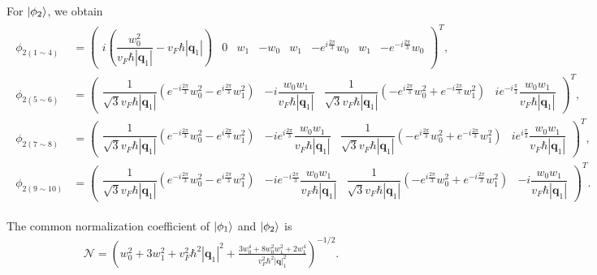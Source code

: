 \documentclass[10pt, oneside]{article}
\newcommand{\p}[1]{\left(#1\right)}
\newcommand{\bv}[1]{\left|#1\right|}
\begin{document}
For \(\ket{\phi_2}\), we obtain
\begin{align}
	\begin{split}
		\phi_{2(1 \sim 4)}
	&=
	\begin{pmatrix}
		i \p{\dfrac{w_{0}^{2}}{v_F \hbar \bv{\bm{q}_1}} - v_F \hbar \bv{\bm{q}_1}} &
		0 &
		w_1 &
		- w_0 &
		w_1 &
		- e^{i \frac{2\pi}{3}} w_0 &
		w_1 &
		- e^{- i \frac{2\pi}{3}} w_0
	\end{pmatrix}^{T},
	\\[0.5em]
	\phi_{2(5 \sim 6)}
	&=
	\begin{pmatrix}
		\dfrac{1}{\sqrt{3} v_F \hbar \bv{\bm{q}_1}}
		\p{e^{-i \frac{2\pi}{3}} w_{0}^{2} - e^{i \frac{2\pi}{3}} w_{1}^{2}} &
		- i \dfrac{w_0 w_1}{v_F \hbar \bv{\bm{q}_1}} &
		\dfrac{1}{\sqrt{3} v_F \hbar \bv{\bm{q}_1}}
		\p{- e^{i \frac{2\pi}{3}} w_{0}^{2} + e^{- i \frac{2\pi}{3}} w_{1}^{2}} &
		i e^{-i \frac{\pi}{3}} \dfrac{w_0 w_1}{v_F \hbar \bv{\bm{q}_1}}
	\end{pmatrix}^{T},
	\\[0.5em]
	\phi_{2(7 \sim 8)}
	&=
	\begin{pmatrix}
		\dfrac{1}{\sqrt{3} v_F \hbar \bv{\bm{q}_1}}
		\p{e^{-i \frac{2\pi}{3}} w_{0}^{2} - e^{i \frac{2\pi}{3}} w_{1}^{2}} &
		- i e^{i \frac{2\pi}{3}} \dfrac{w_0 w_1}{v_F \hbar \bv{\bm{q}_1}} &
		\dfrac{1}{\sqrt{3} v_F \hbar \bv{\bm{q}_1}}
		\p{- e^{i \frac{2\pi}{3}} w_{0}^{2} + e^{- i \frac{2\pi}{3}} w_{1}^{2}} &
		i e^{i \frac{\pi}{3}} \dfrac{w_0 w_1}{v_F \hbar \bv{\bm{q}_1}}
	\end{pmatrix}^{T},
	\\[0.5em]
	\phi_{2(9 \sim 10)}
	&=
	\begin{pmatrix}
		\dfrac{1}{\sqrt{3} v_F \hbar \bv{\bm{q}_1}}
		\p{e^{-i \frac{2\pi}{3}} w_{0}^{2} - e^{i \frac{2\pi}{3}} w_{1}^{2}} &
		- i e^{- i \frac{2\pi}{3}} \dfrac{w_0 w_1}{v_F \hbar \bv{\bm{q}_1}} &
		\dfrac{1}{\sqrt{3} v_F \hbar \bv{\bm{q}_1}}
		\p{- e^{i \frac{2\pi}{3}} w_{0}^{2} + e^{- i \frac{2\pi}{3}} w_{1}^{2}} &
		- i \dfrac{w_0 w_1}{v_F \hbar \bv{\bm{q}_1}}
	\end{pmatrix}^{T}.
	\end{split}
\end{align}

The common normalization coefficient of \(\ket{\phi_1}\) and \(\ket{\phi_2}\) is
\begin{align}
	\mathcal{N}
	=
	\p{
		w^2_{0} + 3 w_{1}^{2} + v_{F}^{2} \hbar ^2 \bv{\bm{q}_{1}}^2
		+ \frac{3 w_{0}^4 + 8 w_{0}^2 w_{1}^2 + 2 w_{1}^4}{v_{F}^{2} \hbar^2 \bv{\bm{q}}_{1}^{2}}
	}^{-1/2}.
\end{align}
\end{document}
